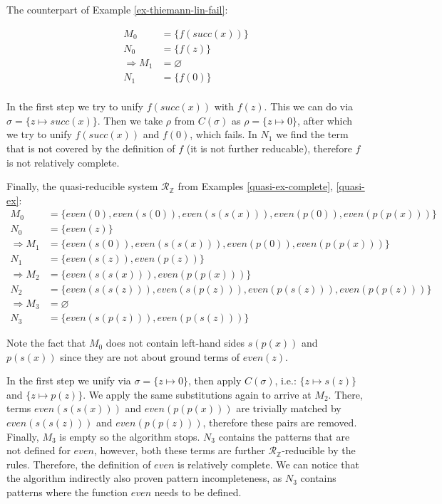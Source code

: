 \begin{example} The counterpart of Example \ref{ex-thiemann-lin-fail}:

\begin{align*}
    M_0 &= \{f(succ(x))\} \\
    N_0 &= \{f(z)\} \\
    \Rightarrow M_1 &= \varnothing \\
    N_1 &= \{f(0)\} \\
\end{align*}

In the first step we try to unify $f(succ(x))$ with $f(z)$. This we can do via $\sigma = \{z \mapsto succ(x)\}$. Then we take $\rho$ from $C(\sigma)$ as $\rho = \{z \mapsto 0\}$, after which we try to unify $f(succ(x))$ and $f(0)$, which fails. In $N_1$ we find the term that is not covered by the definition of $f$ (it is not further reducable), therefore $f$ is not relatively complete.
\end{example}

\begin{example} \label{quasi-ex-alg} Finally, the quasi-reducible system $\mathcal{R}_\mathbb{Z}$ from Examples \ref{quasi-ex-complete}, \ref{quasi-ex}:
\begin{align*}
    M_0 &= \{even(0), even(s(0)), even(s(s(x))), even(p(0)), even(p(p(x)))\} \\
    N_0 &= \{even(z)\} \\
    \Rightarrow M_1 &= \{even(s(0)), even(s(s(x))), even(p(0)), even(p(p(x)))\} \\
    N_1 &= \{even(s(z)), even(p(z))\} \\
    \Rightarrow M_2 &= \{even(s(s(x))), even(p(p(x)))\} \\
    N_2 &= \{even(s(s(z))), even(s(p(z))), even(p(s(z))), even(p(p(z)))\} \\
    \Rightarrow M_3 &= \varnothing \\
    N_3 &= \{even(s(p(z))), even(p(s(z)))\}
\end{align*}

Note the fact that $M_0$ does not contain left-hand sides $s(p(x))$ and $p(s(x))$ since they are not about ground terms of $even(z)$.

In the first step we unify via $\sigma = \{z \mapsto 0\}$, then apply $C(\sigma)$, i.e.: $\{z \mapsto s(z)\}$ and $\{z \mapsto p(z)\}$. We apply the same substitutions again to arrive at $M_2$. There, terms $even(s(s(x)))$ and $even(p(p(x)))$ are trivially matched by $even(s(s(z)))$ and $even(p(p(z)))$, therefore these pairs are removed. Finally, $M_3$ is empty so the algorithm stops. $N_3$ contains the patterns that are not defined for $even$, however, both these terms are further $\mathcal{R}_\mathbb{Z}$-reducible by the rules. Therefore, the definition of $even$ is relatively complete. We can notice that the algorithm indirectly also proven pattern incompleteness, as $N_3$ contains patterns where the function $even$ needs to be defined.

\end{example}

